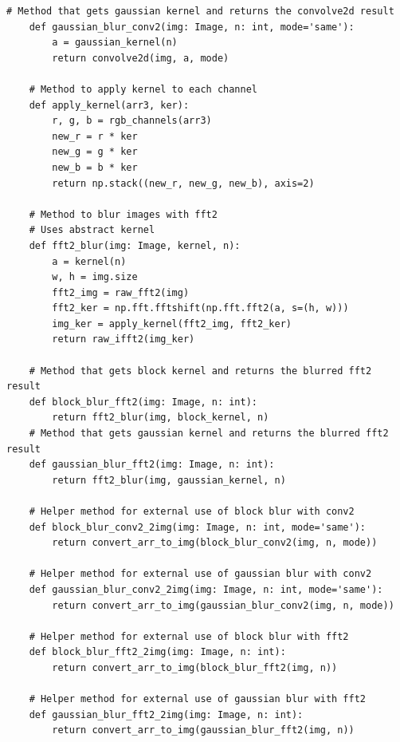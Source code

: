\documentclass[a4paper, 12pt]{article}
\begin{document}
\begin{lstlisting}[label=task2, caption={Программные методы, необходимые для задания 2}]
    # Method that gets gaussian kernel and returns the convolve2d result
    def gaussian_blur_conv2(img: Image, n: int, mode='same'):
        a = gaussian_kernel(n)
        return convolve2d(img, a, mode)

    # Method to apply kernel to each channel
    def apply_kernel(arr3, ker):
        r, g, b = rgb_channels(arr3)
        new_r = r * ker
        new_g = g * ker
        new_b = b * ker
        return np.stack((new_r, new_g, new_b), axis=2)

    # Method to blur images with fft2
    # Uses abstract kernel
    def fft2_blur(img: Image, kernel, n):
        a = kernel(n)
        w, h = img.size
        fft2_img = raw_fft2(img)
        fft2_ker = np.fft.fftshift(np.fft.fft2(a, s=(h, w)))
        img_ker = apply_kernel(fft2_img, fft2_ker)
        return raw_ifft2(img_ker)

    # Method that gets block kernel and returns the blurred fft2 result
    def block_blur_fft2(img: Image, n: int):
        return fft2_blur(img, block_kernel, n)
    # Method that gets gaussian kernel and returns the blurred fft2 result
    def gaussian_blur_fft2(img: Image, n: int):
        return fft2_blur(img, gaussian_kernel, n)

    # Helper method for external use of block blur with conv2
    def block_blur_conv2_2img(img: Image, n: int, mode='same'):
        return convert_arr_to_img(block_blur_conv2(img, n, mode))
    
    # Helper method for external use of gaussian blur with conv2
    def gaussian_blur_conv2_2img(img: Image, n: int, mode='same'):
        return convert_arr_to_img(gaussian_blur_conv2(img, n, mode))
    
    # Helper method for external use of block blur with fft2
    def block_blur_fft2_2img(img: Image, n: int):
        return convert_arr_to_img(block_blur_fft2(img, n))
    
    # Helper method for external use of gaussian blur with fft2
    def gaussian_blur_fft2_2img(img: Image, n: int):
        return convert_arr_to_img(gaussian_blur_fft2(img, n))
    \end{lstlisting}
\end{document}
